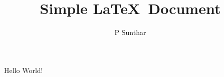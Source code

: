 \documentclass{article}
\begin{document}
\title{Simple \LaTeX\ Document}
\author{P Sunthar}
\maketitle


Hello World!
\end{document}
